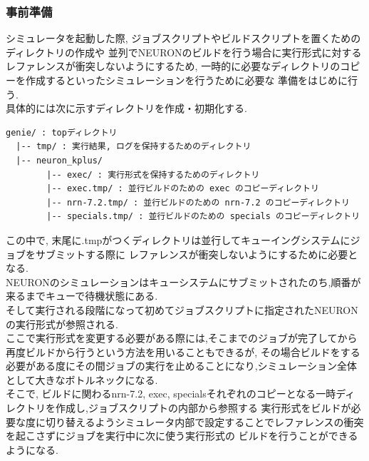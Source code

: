 \subsubsection{事前準備}
シミュレータを起動した際, ジョブスクリプトやビルドスクリプトを置くためのディレクトリの作成や
並列でNEURONのビルドを行う場合に実行形式に対するレファレンスが衝突しないようにするため,
一時的に必要なディレクトリのコピーを作成するといったシミュレーションを行うために必要な
準備をはじめに行う.\\
具体的には次に示すディレクトリを作成・初期化する.\\
{\footnotesize
\begin{lstlisting}[numbers=none, caption=作成されるディレクトリ]
genie/ : topディレクトリ
  |-- tmp/ : 実行結果, ログを保持するためのディレクトリ
  |-- neuron_kplus/
        |-- exec/ : 実行形式を保持するためのディレクトリ
        |-- exec.tmp/ : 並行ビルドのための exec のコピーディレクトリ
        |-- nrn-7.2.tmp/ : 並行ビルドのための nrn-7.2 のコピーディレクトリ
        |-- specials.tmp/ : 並行ビルドのための specials のコピーディレクトリ
\end{lstlisting}
}
この中で, 末尾に.tmpがつくディレクトリは並行してキューイングシステムにジョブをサブミットする際に
レファレンスが衝突しないようにするために必要となる.\\
NEURONのシミュレーションはキューシステムにサブミットされたのち,順番が来るまでキューで待機状態にある.\\
そして実行される段階になって初めてジョブスクリプトに指定されたNEURONの実行形式が参照される.\\
ここで実行形式を変更する必要がある際には,そこまでのジョブが完了してから再度ビルドから行うという方法を用いることもできるが,
その場合ビルドをする必要がある度にその間ジョブの実行を止めることになり,シミュレーション全体として大きなボトルネックになる.\\
そこで, ビルドに関わるnrn-7.2, exec, specialsそれぞれのコピーとなる一時ディレクトリを作成し,ジョブスクリプトの内部から参照する
実行形式をビルドが必要な度に切り替えるようシミュレータ内部で設定することでレファレンスの衝突を起こさずにジョブを実行中に次に使う実行形式の
ビルドを行うことができるようになる.\\

